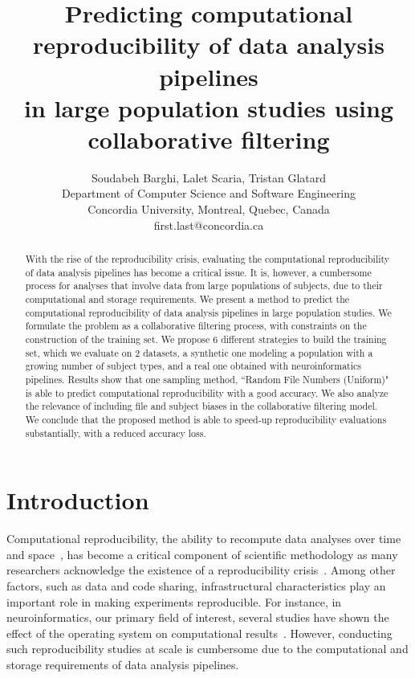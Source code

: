 \documentclass[10pt, conference, compsocconf]{IEEEtran}
\begin{document}
\title{Predicting computational reproducibility of data analysis pipelines \\in large population studies using collaborative filtering}

\author{Soudabeh Barghi, Lalet Scaria, Tristan Glatard\\
  Department of Computer Science and Software Engineering\\ Concordia University, Montreal, Quebec, Canada\\
  {first.last}@concordia.ca}

\maketitle

\begin{abstract}
With the rise of the reproducibility crisis, evaluating the 
computational reproducibility of data analysis pipelines has become a 
critical issue. It is, however, a cumbersome 
process for analyses that involve data from large populations of 
subjects, due to their computational and storage requirements. 
We present a method to predict the computational 
reproducibility of data analysis pipelines in large population studies. 
We formulate the problem as a collaborative filtering process, with 
constraints on the construction of the training set. We propose 6 
different strategies to build the training set, which we evaluate on 2 
datasets, a synthetic one modeling a population with a growing number 
of subject types, and a real one obtained with neuroinformatics 
pipelines. Results show that one sampling method, ``Random File Numbers 
(Uniform)" is able to predict computational reproducibility with a good 
accuracy. We also analyze the relevance of including file and subject 
biases in the collaborative filtering model. We conclude that the 
proposed method is able to speed-up reproducibility 
evaluations substantially, with a reduced accuracy loss.
\end{abstract}

\section{Introduction}

Computational reproducibility, the ability to recompute data analyses 
over time and 
space~\cite{peng2011reproducible}, has become a critical component of 
scientific methodology as many researchers acknowledge the existence of 
a reproducibility crisis~\cite{baker2016there}. Among other factors, 
such as data and code sharing, infrastructural characteristics 
play an important role in making experiments reproducible. For instance, in 
neuroinformatics, our primary field of interest, several studies have 
shown the effect of the 
operating system on computational 
results~\cite{gronenschild2012effects, glatard2015reproducibility}.
However, conducting such reproducibility studies at scale is cumbersome 
due to the computational and storage requirements of data analysis 
pipelines.
\end{document}
